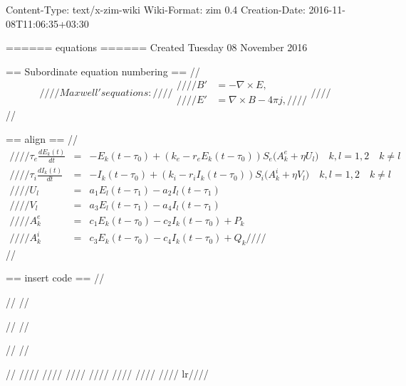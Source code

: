 Content-Type: text/x-zim-wiki
Wiki-Format: zim 0.4
Creation-Date: 2016-11-08T11:06:35+03:30

====== equations ======
Created Tuesday 08 November 2016

== Subordinate equation numbering ==
//\begin{subequations}//
//Maxwell's equations://
//\begin{align}//
//        B'&=-\nabla \times E,\\//
//        E'&=\nabla \times B - 4\pi j,//
//\end{align}//
//\end{subequations}//

== align ==
//\begin{eqnarray*}//
//\tau_e \frac{dE_k(t)}{dt}&= &-E_k(t-\tau_0) +(k_e-r_e E_k(t-\tau_0))S_e\big(A_k^e +\eta U_l\big) \quad k,l =1,2 \quad k\neq l \\//
//\tau_i \frac{dI_k(t)}{dt}&= &-I_k(t-\tau_0) +(k_i-r_i I_k(t-\tau_0))S_i\big(A_k^i +\eta V_l\big) \quad k,l =1,2 \quad k\neq l     \\//
//U_l   &=  &a_1 E_l(t-\tau_1) - a_2 I_l(t-\tau_1) \\//
//V_l   &=  &a_3 E_l(t-\tau_1) -a_4 I_l(t-\tau_1)  \\//
//A_k^e &=  &c_1E_k(t-\tau_0) -c_2I_k(t-\tau_0) +P_k  \\//
//A_k^i &=  &c_3E_k(t-\tau_0) -c_4I_k(t-\tau_0) +Q_k    //
//\end{eqnarray*}//

== insert code ==
//\usepackage{listings}//
//\usepackage{listings}//
//\usepackage{float}//
//\usepackage{color}//
////
////
////
////
////
////
////
lr{//}//

